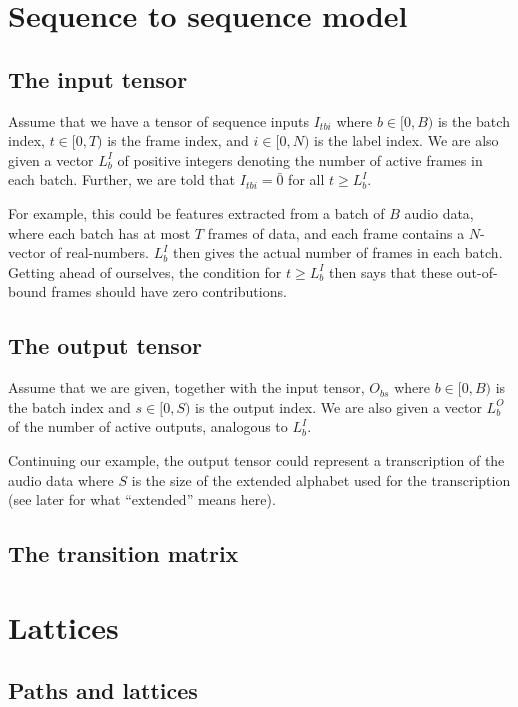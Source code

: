 \documentclass[a4paper]{article}
\begin{document}
\section{Sequence to sequence model}

\subsection{The input tensor}

Assume that we have a tensor of sequence inputs $I_{tbi}$ where $b \in [0, B)$ is the batch index, $t \in [0, T)$ is the frame index, and $i \in [0, N)$ is the label index. We are also given a vector $L^I_b$ of positive integers denoting the number of active frames in each batch. Further, we are told that $I_{tbi} = \bar{0}$ for all $t \geq L^I_b$.

For example, this could be features extracted from a batch of $B$ audio data, where each batch has at most $T$ frames of data, and each frame contains a $N$-vector of real-numbers. $L^I_b$ then gives the actual number of frames in each batch. Getting ahead of ourselves, the condition for $t \geq L^I_b$ then says that these out-of-bound frames should have zero contributions.

\subsection{The output tensor}

Assume that we are given, together with the input tensor, $O_{bs}$ where $b \in [0, B)$ is the batch index and $s \in [0, S)$ is the output index. We are also given a vector $L^O_b$ of the number of active outputs, analogous to $L^I_b$.

Continuing our example, the output tensor could represent a transcription of the audio data where $S$ is the size of the extended alphabet used for the transcription (see later for what ``extended'' means here).

\subsection{The transition matrix}

\section{Lattices}

\subsection{Paths and lattices}
\end{document}
